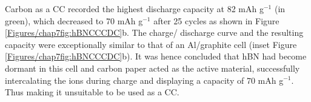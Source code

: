 Carbon as a CC recorded the highest discharge capacity at 82 mAh g$^{-1}$ (in green), which decreased to 70 mAh g$^{-1}$ after 25 cycles as shown in Figure \ref{Figures/chap7fig:hBNCCCDC}b. The charge/ discharge curve and the resulting capacity were exceptionally similar to that of an Al/graphite cell (inset Figure \ref{Figures/chap7fig:hBNCCCDC}b). It was hence concluded that hBN had become dormant in this cell and carbon paper acted as the active material, successfully intercalating the  ions during charge and displaying a capacity of 70 mAh g$^{-1}$. Thus making it unsuitable to be used as a CC. 
